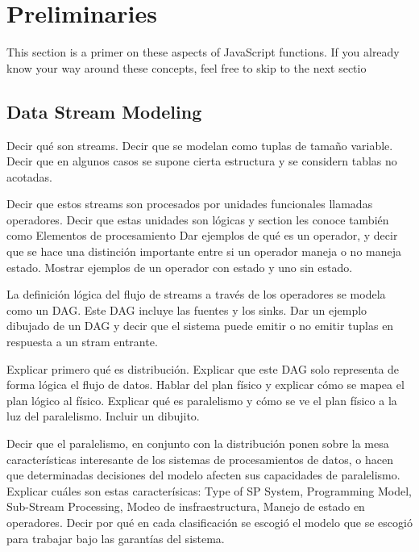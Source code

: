 \chapter{Preliminaries
  \label{chapter:preliminaries}}

  This section is a primer on these aspects of JavaScript functions. If you already know your way around these concepts, feel free to skip to the next sectio

  \section{Data Stream Modeling}

  Decir qué son streams. Decir que se modelan como tuplas de tamaño variable. \cite{kamburugamuve2013survey} Decir que en algunos casos se supone cierta estructura y se considern tablas no acotadas.\cite{KottoKombi2015ParallelAD}

  Decir que estos streams son procesados por unidades funcionales llamadas operadores. Decir que estas unidades son lógicas y section les conoce también como Elementos de procesamiento \cite{kamburugamuve2013survey} Dar ejemplos de qué es un operador, y decir que se hace una distinción importante entre si un operador maneja o no maneja estado. Mostrar ejemplos de un operador con estado y uno sin estado.
  \cite{KottoKombi2015ParallelAD}

  La definición lógica del flujo de streams a través de los operadores se modela como un DAG. Este DAG incluye las fuentes y los sinks. Dar un ejemplo dibujado de un DAG y decir que el sistema puede emitir o no emitir tuplas en respuesta a un stram entrante.

  Explicar primero qué es distribución. Explicar que este DAG solo representa de forma lógica el flujo de datos. Hablar del plan físico y explicar cómo se mapea el plan lógico al físico. Explicar qué es paralelismo y cómo se ve el plan físico a la luz del paralelismo. Incluir un dibujito.
  \cite{kamburugamuve2013survey}

  Decir que el paralelismo, en conjunto con la distribución ponen sobre la mesa características interesante de los sistemas de procesamientos de datos, o hacen que determinadas decisiones del modelo afecten sus capacidades de paralelismo. Explicar cuáles son estas caracterísicas: Type of SP System, Programming Model, Sub-Stream Processing, Modeo de insfraestructura, Manejo de estado en operadores. \cite{R_ger_2019} Decir por qué en cada clasificación se escogió el modelo que se escogió para trabajar bajo las garantías del sistema.

